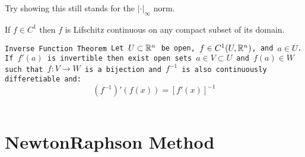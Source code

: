\documentclass[11pt,a4paper]{article}
\begin{document}
	\noindent Try showing this still stands for the $|\cdot|_\infty$ norm.
	\begin{corollary}
		If $f \in C^1$ then $f$ is Lifschitz continuous on any compact
		subset of its domain.
	\end{corollary}
	\begin{theorem}
	\tt{Inverse Function Theorem}
	Let $U \subset \mathbb{R}^n$ be open,
	$f \in C^1(U,\mathbb{R}^n)$, and $a \in U$. If $f'(a)$ is invertible then
	exist open sets $a \in V \subset U$ and $f(a) \in W$ such that
	$f \colon V \to W$ is a bijection and $f^{-1}$ is also continuously 
	differetiable and:
	\[
		(f^{-1})'(f(x)) = [f'(x)]^{-1}
	\]
	\end{theorem}
	
	
	\newpage
	
  \section{Newton\textendash{}Raphson Method}
	
	\newpage
	
\end{document}

